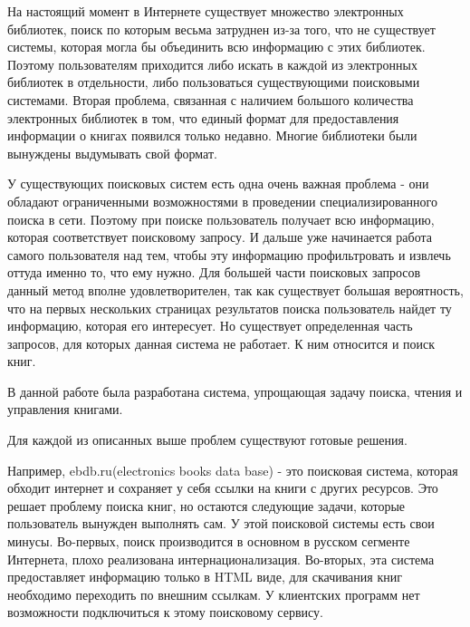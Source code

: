 \documentclass[a4paper]{report}
\begin{document}
На настоящий момент в Интернете существует множество электронных библиотек, поиск по которым весьма затруднен из-за того, что не существует системы, которая могла бы объединить всю информацию с этих библиотек. Поэтому пользователям приходится либо искать в каждой из электронных библиотек в отдельности, либо пользоваться существующими поисковыми системами. Вторая проблема, связанная с наличием большого количества электронных библиотек в том, что единый формат для предоставления информации о книгах появился только недавно. Многие библиотеки были вынуждены выдумывать свой формат. 

У существующих поисковых систем есть одна очень важная проблема - они обладают ограниченными возможностями в проведении специализированного поиска в сети. Поэтому при поиске пользователь получает всю информацию, которая соответствует поисковому запросу. И дальше уже начинается работа самого пользователя над тем, чтобы эту информацию профильтровать и извлечь оттуда именно то, что ему нужно. Для большей части поисковых запросов данный метод вполне удовлетворителен, так как существует большая вероятность, что на первых нескольких страницах результатов поиска пользователь найдет ту информацию, которая его интересует. Но существует определенная часть запросов, для которых данная система не работает. К ним относится и поиск книг.


В данной работе была разработана система, упрощающая задачу поиска, чтения и управления книгами. 



Для каждой из описанных выше проблем существуют готовые решения. 


Например, ebdb.ru(electronics books data base)  - это поисковая система, которая обходит интернет и сохраняет у себя ссылки на книги с других ресурсов. Это решает проблему поиска книг, но остаются следующие задачи, которые пользователь вынужден выполнять сам. У этой поисковой системы есть свои минусы. Во-первых, поиск производится в основном в русском сегменте Интернета, плохо реализована интернационализация. Во-вторых, эта система предоставляет информацию только в HTML виде, для скачивания книг необходимо переходить по внешним ссылкам. У клиентских программ нет возможности подключиться к этому поисковому сервису.%
\end{document}
